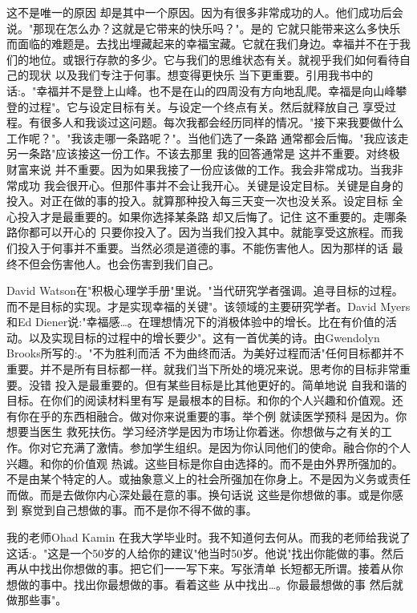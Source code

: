 这不是唯一的原因 却是其中一个原因。因为有很多非常成功的人。他们成功后会说。"那现在怎么办？这就是它带来的快乐吗？"。是的 它就只能带来这么多快乐 而面临的难题是。去找出埋藏起来的幸福宝藏。它就在我们身边。幸福并不在于我们的地位。或银行存款的多少。它与我们的思维状态有关。就视乎我们如何看待自己的现状 以及我们专注于何事。想变得更快乐 当下更重要。引用我书中的话:。"幸福并不是登上山峰。也不是在山的四周没有方向地乱爬。幸福是向山峰攀登的过程"。它与设定目标有关。与设定一个终点有关。然后就释放自己 享受过程。有很多人和我谈过这问题。每次我都会经历同样的情况。"接下来我要做什么工作呢？"。"我该走哪一条路呢？"。当他们选了一条路 通常都会后悔。"我应该走另一条路"应该接这一份工作。不该去那里 我的回答通常是 这并不重要。对终极财富来说 并不重要。因为如果我接了一份应该做的工作。我会非常成功。当我非常成功 我会很开心。但那件事并不会让我开心。关键是设定目标。关键是自身的投入。对正在做的事的投入。就算那种投入每三天变一次也没关系。设定目标 全心投入才是最重要的。如果你选择某条路 却又后悔了。记住 这不重要的。走哪条路你都可以开心的 只要你投入了。因为当我们投入其中。就能享受这旅程。而我们投入于何事并不重要。当然必须是道德的事。不能伤害他人。因为那样的话 最终不但会伤害他人。也会伤害到我们自己。 

David Watson在"积极心理学手册"里说。"当代研究学者强调。追寻目标的过程。而不是目标的实现。才是实现幸福的关键"。该领域的主要研究学者。David Myers和Ed Diener说:"幸福感…。在理想情况下的消极体验中的增长。比在有价值的活动。以及实现目标的过程中的增长要少"。这有一首优美的诗。由Gwendolyn Brooks所写的:。"不为胜利而活 不为曲终而活。为美好过程而活"任何目标都并不重要。并不是所有目标都一样。就我们当下所处的境况来说。思考你的目标非常重要。没错 投入是最重要的。但有某些目标是比其他更好的。简单地说 自我和谐的目标。在你们的阅读材料里有写 是最根本的目标。和你的个人兴趣和价值观。还有你在乎的东西相融合。做对你来说重要的事。举个例 就读医学预科 是因为。你想要当医生 救死扶伤。学习经济学是因为市场让你着迷。你想做与之有关的工作。你对它充满了激情。参加学生组织。是因为你认同他们的使命。融合你的个人兴趣。和你的价值观 热诚。这些目标是你自由选择的。而不是由外界所强加的。不是由某个特定的人。或抽象意义上的社会所强加在你身上。不是因为义务或责任而做。而是去做你内心深处最在意的事。换句话说 这些是你想做的事。或是你感到 察觉到自己想做的事。而不是你不得不做的事。 

我的老师Ohad Kamin 在我大学毕业时。我不知道何去何从。而我的老师给我说了这话:。"这是一个50岁的人给你的建议"他当时50岁。他说"找出你能做的事。然后再从中找出你想做的事。把它们一一写下来。写张清单 长短都无所谓。接着从你想做的事中。找出你最想做的事。看着这些 从中找出…。你最最想做的事 然后就做那些事"。 

